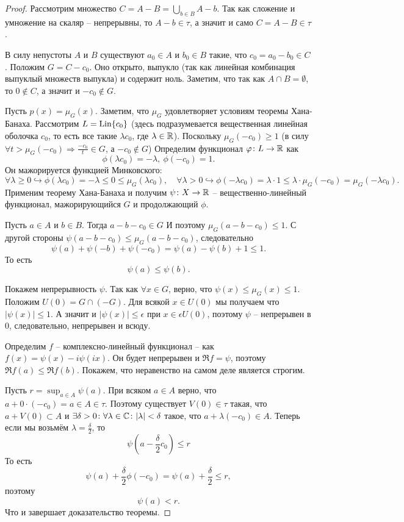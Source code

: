 \begin{proof}
    Рассмотрим множество $C = A - B = \bigcup_{b \in B} A - b$.
    Так как сложение и умножение на скаляр -- непрерывны, то $A - b \in \tau$, а значит и само $C = A - B \in \tau$.

    В силу непустоты $A$ и $B$ существуют $a_0 \in A$ и $b_0 \in B$ такие, что $c_0 = a_0 - b_0 \in C$.
    Положим $G = C - c_0$.
    Оно открыто, выпукло (так как линейная комбинация выпуклый множеств выпукла) и содержит ноль.
    Заметим, что так как $A \cap B = \emptyset$, то $0 \notin C$, а значит и $-c_0 \notin G$.

    Пусть $p(x) = \mu_G(x)$.
    Заметим, что $\mu_G$ удовлетворяет условиям теоремы Хана-Банаха.
    Рассмотрим $L = \operatorname{Lin}\{c_0\}$ (здесь подразумевается вещественная линейная оболочка $c_0$, то есть все такие $\lambda c_0$, где $\lambda \in \mathbb{R}$).
    Поскольку $\mu_G(-c_0) \geq 1$ (в силу $\forall t > \mu_G(-c_0) \Rightarrow \frac{-c_0}{t} \in G$, а $-c_0 \notin G$)
    Определим функционал $\varphi\colon L \to \mathbb{R}$ как
    \[
        \phi(\lambda c_0) = -\lambda, \ \phi(-c_0) = 1.
    \]
    Он мажорируется функцией Минковского:
    \[
        \forall \lambda \geq 0 \hookrightarrow \phi(\lambda c_0) = -\lambda \leq 0 \leq \mu_G(\lambda c_0), \quad \forall \lambda > 0 \hookrightarrow \phi(-\lambda c_0) = \lambda \cdot 1 \leq \lambda \cdot \mu_G(-c_0) = \mu_G(-\lambda c_0).
    \]
    Применим теорему Хана-Банаха и получим $\psi\colon X \to \mathbb{R}$ -- вещественно-линейный функционал, мажорирующийся $G$ и продолжающий $\phi$.

    Пусть $a \in A$ и $b \in B$.
    Тогда $a - b - c_0 \in G$
    И поэтому $\mu_G(a - b - c_0) \leq 1$.
    С другой стороны $\psi(a - b - c_0) \leq \mu_G(a - b - c_0)$, следовательно
    \[
        \psi(a) + \psi(-b) + \psi(-c_0) = \psi(a) - \psi(b) + 1 \leq 1.
    \]
    То есть
    \[
        \psi(a) \leq \psi(b).
    \]

    Покажем непрерывность $\psi$.
    Так как $\forall x \in G$, верно, что $\psi(x) \leq \mu_G(x) \leq 1$.
    Положим $U(0) = G \cap (-G)$.
    Для всякой $x \in U(0)$ мы получаем что $|\psi(x)| \leq 1$.
    А значит и $|\psi(x)| \leq \epsilon$ при $x \in \epsilon U(0)$, поэтому $\psi$ -- непрерывен в 0, следовательно, непрерывен и всюду.

    Определим $f$ -- комплексно-линейный функционал -- как $f(x) = \psi(x) - i \psi(ix)$.
    Он будет непрерывен и $\Re f = \psi$, поэтому $\Re f(a) \leq \Re f(b)$.
    Покажем, что неравенство на самом деле является строгим.

    Пусть $r = \sup_{a \in A}\psi(a)$.
    При всяком $a \in A$ верно, что $a + 0 \cdot (-c_0) = a \in A \in \tau$.
    Поэтому существует $V(0) \in \tau$ такая, что $a + V(0) \subset A$ и $\exists \delta > 0\colon \forall \lambda \in \mathbb{C}\colon |\lambda| < \delta$ такое, что $a + \lambda(-c_0) \in A$.
    Теперь если мы возьмём $\lambda = \frac{\delta}{2}$, то
    \[
        \psi\left(a -\frac{\delta}{2}c_0\right) \leq r
    \]
    То есть
    \[
        \psi(a) + \frac{\delta}{2}\phi(-c_0) = \psi(a) + \frac{\delta}{2} \leq r,
    \]
    поэтому
    \[
        \psi(a) < r.
    \]
    Что и завершает доказательство теоремы.
\end{proof}
